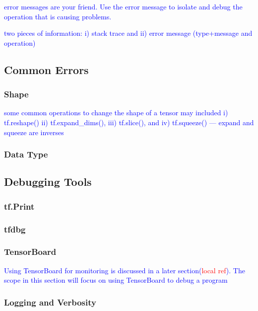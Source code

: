 \textcolor{blue}{error messages are your friend. Use the error message to isolate and debug the operation that is causing problems.}

\textcolor{blue}{two pieces of information: i) stack trace and ii) error message (type+message and operation) }

\subsection{Common Errors}
\subsubsection{Shape}

\textcolor{blue}{some common operations to change the shape of a tensor may included i) tf.reshape() ii) tf.expand\_dims(), iii) tf.slice(), and iv) tf.squeeze() --- expand and squeeze are inverses} 

\subsubsection{Data Type}

\subsection{Debugging Tools}

\subsubsection{tf.Print}

\subsubsection{tfdbg}



\subsubsection{TensorBoard}


\textcolor{blue}{Using TensorBoard for monitoring is discussed in a later section(\textcolor{red}{local ref}). The scope in this section will focus on using TensorBoard to debug a program}

\subsubsection{Logging and Verbosity}






